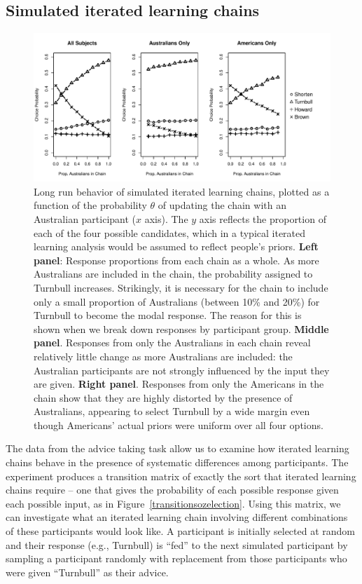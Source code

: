 \documentclass[doc]{apa6}
\begin{document}
\subsection{Simulated iterated learning chains}

\begin{figure}[t]
\begin{center}
\includegraphics[width=15cm]{chainPol.pdf}
\caption{\small{Long run behavior of simulated iterated learning chains, plotted as a function of the probability $\theta$ of updating the chain with an Australian participant ($x$ axis). The $y$ axis reflects the proportion of each of the four possible candidates, which in a typical iterated learning analysis would be assumed to reflect people's priors.  {\bf Left panel}: Response proportions from each chain as a whole. As more Australians are included in the chain, the probability assigned to Turnbull increases. Strikingly, it is necessary for the chain to include only a small proportion of Australians (between 10\% and 20\%) for Turnbull to become the modal response. The reason for this is shown when we break down responses by participant group. {\bf Middle panel}. Responses from only the Australians in each chain reveal relatively little change as more Australians are included: the Australian participants are not strongly influenced by the input they are given. {\bf Right panel}. Responses from only the Americans in the chain show that they are highly distorted by the presence of Australians, appearing to select Turnbull by a wide margin even though Americans' actual priors were uniform over all four options.}}
\label{chainPol}
\end{center}
\end{figure}


The data from the {\sc advice taking} task allow us to examine how iterated learning chains behave in the presence of systematic differences among participants. The experiment produces a transition matrix of exactly the sort that iterated learning chains require -- one that gives the probability of each possible response given each possible input, as in Figure~\ref{transitionsozelection}. Using this matrix, we can investigate what an iterated learning chain involving different combinations of these participants would look like. A participant is initially selected at random and their response (e.g., Turnbull) is ``fed'' to the next simulated participant by sampling a participant randomly with replacement from those participants who were given ``Turnbull'' as their advice.
\end{document}
